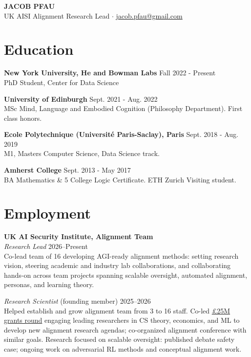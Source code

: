 \documentclass[11pt,letterpaper]{article}
\begin{document}
\begin{center}
    {\LARGE\textbf{JACOB PFAU}}\\[4pt]
    UK AISI Alignment Research Lead $\cdot$
    \href{mailto:jacob.pfau@gmail.com}{jacob.pfau@gmail.com} 
    
\end{center}
\vspace{-10pt}

\section{Education}

\textbf{New York University, He and Bowman Labs} \hfill Fall 2022 - Present\\
PhD Student, Center for Data Science
\vspace{4pt}

\textbf{University of Edinburgh} \hfill Sept. 2021 - Aug. 2022\\
MSc Mind, Language and Embodied Cognition (Philosophy Department). First class honors.
\vspace{4pt}

\textbf{Ecole Polytechnique (Université Paris-Saclay), Paris} \hfill Sept. 2018 - Aug. 2019\\
M1, Masters Computer Science, Data Science track. 
\vspace{4pt}

\textbf{Amherst College} \hfill Sept. 2013 - May 2017\\
BA Mathematics \& 5 College Logic Certificate. ETH Zurich Visiting student. 

\section{Employment}

\textbf{UK AI Security Institute, Alignment Team}\\
\textit{Research Lead} \hfill 2026--Present\\
Co-lead team of 16 developing AGI-ready alignment methods: setting research vision, steering academic and industry lab collaborations, and collaborating hands-on across team projects spanning scalable oversight, automated alignment, personas, and learning theory.
\vspace{2pt}

\textit{Research Scientist} (founding member) \hfill 2025--2026\\
Helped establish and grow alignment team from 3 to 16 staff. Co-led \href{https://alignmentproject.aisi.gov.uk/}{£25M grants round} engaging leading researchers in CS theory, economics, and ML to develop new alignment research agendas; co-organized alignment conference with similar goals. Research focused on scalable oversight: published debate safety case; ongoing work on adversarial RL methods and conceptual alignment work.
\vspace{4pt}
\end{document}
